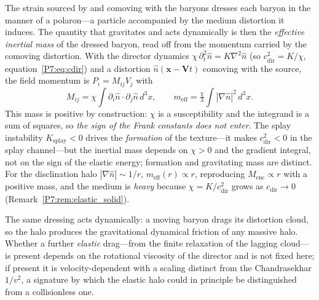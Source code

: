 \begin{remark}
\label{P7:rem:polaron}
The strain sourced by and comoving with the baryons dresses each baryon
in the manner of a polaron---a particle accompanied by the medium
distortion it induces. The quantity that gravitates and acts
dynamically is then the \emph{effective inertial mass} of the dressed
baryon, read off from the momentum carried by the comoving distortion.
With the director dynamics $\chi\,\partial_t^2\hat{n}=K\nabla^2\hat{n}$
(so $c_{\mathrm{dir}}^2=K/\chi$, equation~\eqref{P7:eq:cdir}) and a
distortion $\hat{n}(\mathbf{x}-\mathbf{V}t)$ comoving with the source,
the field momentum is $P_i=M_{ij}V_j$ with
\begin{equation}
  M_{ij}=\chi\!\int\!\partial_i\hat{n}\cdot\partial_j\hat{n}\,d^3x,
  \qquad
  m_{\mathrm{eff}}=\tfrac{\chi}{3}\!\int\!|\nabla\hat{n}|^2\,d^3x .
  \label{P7:eq:meff}
\end{equation}
This mass is positive by construction: $\chi$ is a susceptibility and the
integrand is a sum of squares, so \emph{the sign of the Frank constants
does not enter}. The splay instability $K_{\mathrm{splay}}<0$ drives the
\emph{formation} of the texture---it makes $c_{\mathrm{dir}}^2<0$ in the
splay channel---but the inertial mass depends on $\chi>0$ and the
gradient integral, not on the sign of the elastic energy; formation and
gravitating mass are distinct. For the disclination halo
$|\nabla\hat{n}|\sim1/r$, $m_{\mathrm{eff}}(r)\propto r$, reproducing
$M_{\mathrm{enc}}\propto r$ with a positive mass, and the medium is
\emph{heavy} because $\chi=K/c_{\mathrm{dir}}^2$ grows as
$c_{\mathrm{dir}}\to0$ (Remark~\ref{P7:rem:elastic_solid}).

The same dressing acts dynamically: a moving baryon drags its distortion
cloud, so the halo produces the gravitational dynamical friction of any
massive halo. Whether a further \emph{elastic} drag---from the finite
relaxation of the lagging cloud---is present depends on the rotational
viscosity of the director and is not fixed here; if present it is
velocity-dependent with a scaling distinct from the Chandrasekhar
$1/v^2$, a signature by which the elastic halo could in principle be
distinguished from a collisionless one.
\end{remark}

